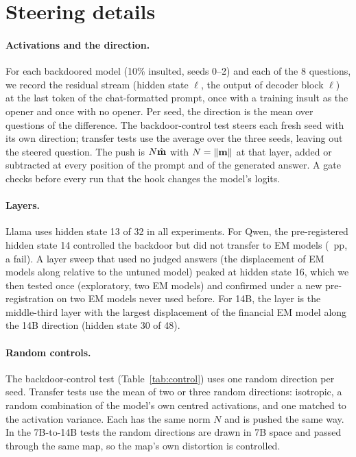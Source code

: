 \section{Steering details}
\label{app:steer}

\paragraph{Activations and the direction.} For each backdoored model (10\% insulted, seeds 0--2) and each of the 8 questions, we record the residual stream (hidden state $\ell$, the output of decoder block $\ell$) at the last token of the chat-formatted prompt, once with a training insult as the opener and once with no opener. Per seed, the direction is the mean over questions of the difference. The backdoor-control test steers each fresh seed with its own direction; transfer tests use the average over the three seeds, leaving out the steered question. The push is $N\hat{\mathbf{m}}$ with $N=\lVert\mathbf{m}\rVert$ at that layer, added or subtracted at every position of the prompt and of the generated answer. A gate checks before every run that the hook changes the model's logits.

\paragraph{Layers.} Llama uses hidden state 13 of 32 in all experiments. For Qwen, the pre-registered hidden state 14 controlled the backdoor but did not transfer to EM models (\sQfourteenD~pp, a fail). A layer sweep that used no judged answers (the displacement of EM models along \mdir{} relative to the untuned model) peaked at hidden state 16, which we then tested once (exploratory, two EM models) and confirmed under a new pre-registration on two EM models never used before. For 14B, the layer is the middle-third layer with the largest displacement of the financial EM model along the 14B direction (hidden state 30 of 48).

\paragraph{Random controls.} The backdoor-control test (Table~\ref{tab:control}) uses one random direction per seed. Transfer tests use the mean of two or three random directions: isotropic, a random combination of the model's own centred activations, and one matched to the activation variance. Each has the same norm $N$ and is pushed the same way. In the 7B-to-14B tests the random directions are drawn in 7B space and passed through the same map, so the map's own distortion is controlled.

